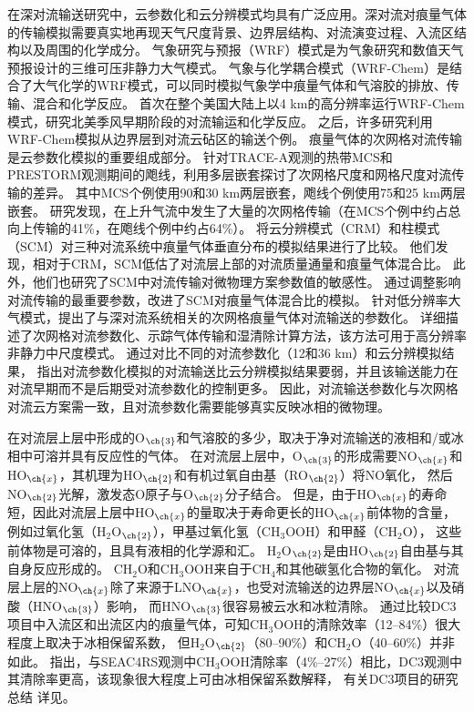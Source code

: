 在深对流输送研究中，云参数化和云分辨模式均具有广泛应用。深对流对痕量气体的传输模拟需要真实地再现天气尺度背景、边界层结构、对流演变过程、入流区结构以及周围的化学成分。 气象研究与预报（WRF）模式是为气象研究和数值天气预报设计的三维可压非静力大气模式。
气象与化学耦合模式（WRF-Chem）是结合了大气化学的WRF模式，可以同时模拟气象学中痕量气体和气溶胶的排放、传输、混合和化学反应\citep{Fast.2006,Grell.2005}。
\citet{Barth.2012}首次在整个美国大陆上以4 km的高分辨率运行WRF-Chem模式，研究北美季风早期阶段的对流输运和化学反应。
之后，许多研究利用WRF-Chem模拟从边界层到对流云砧区的输送个例\citep{Bela.2016,Li.2017b,Li.2018}。
痕量气体的次网格对流传输是云参数化模拟的重要组成部分。
\citet{Wang.1996}针对TRACE-A观测的热带MCS和PRESTORM观测期间的飑线，利用多层嵌套探讨了次网格尺度和网格尺度对流传输的差异。
其中MCS个例使用90和30 km两层嵌套，飑线个例使用75和25 km两层嵌套。
研究发现，在上升气流中发生了大量的次网格传输（在MCS个例中约占总向上传输的41\%，在飑线个例中约占64\%）。
\citet{Ott.2009}将云分辨模式（CRM）和柱模式（SCM）对三种对流系统中痕量气体垂直分布的模拟结果进行了比较。
他们发现，相对于CRM，SCM低估了对流层上部的对流质量通量和痕量气体混合比。
此外，他们也研究了SCM中对流传输对微物理方案参数值的敏感性。
通过调整影响对流传输的最重要参数，改进了SCM对痕量气体混合比的模拟。
\citet{Freitas.2000}针对低分辨率大气模式，提出了与深对流系统相关的次网格痕量气体对流输送的参数化。
\citet{Grell.2014}详细描述了次网格对流参数化、示踪气体传输和湿清除计算方法，该方法可用于高分辨率非静力中尺度模式。
\citet{Li.2018}通过对比不同的对流参数化（12和36 km）和云分辨模拟结果，
指出对流参数化模拟的对流输送比云分辨模拟结果要弱，并且该输送能力在对流早期而不是后期受对流参数化的控制更多。
因此，对流输送参数化与次网格对流云方案需一致，且对流参数化需要能够真实反映冰相的微物理。

在对流层上层中形成的O$_{\ch{3}}$和气溶胶的多少，取决于净对流输送的液相和/或冰相中可溶并具有反应性的气体。
在对流层上层中，O$_{\ch{3}}$的形成需要NO$_{\ch{x}}$和HO$_{\ch{x}}$，其机理为HO$_{\ch{2}}$和有机过氧自由基（RO$_{\ch{2}}$）将NO氧化，
然后NO$_{\ch{2}}$光解，激发态O原子与O$_{\ch{2}}$分子结合。
但是，由于HO$_{\ch{x}}$的寿命短，因此对流层上层中HO$_{\ch{x}}$的量取决于寿命更长的HO$_{\ch{x}}$前体物的含量\citep{Chatfield.1984,Prather.1997}，
例如过氧化氢（H$_2$O$_{\ch{2}}$），甲基过氧化氢（CH$_3$OOH）和甲醛（CH$_2$O），
这些前体物是可溶的，且具有液相的化学源和汇\citep{Barth.2007,Carlton.2007}。
H$_2$O$_{\ch{2}}$是由HO$_{\ch{2}}$自由基与其自身反应形成的。 CH$_2$O和CH$_3$OOH来自于CH$_4$和其他碳氢化合物的氧化。
对流层上层的NO$_{\ch{x}}$除了来源于LNO$_{\ch{x}}$，也受对流输送的边界层NO$_{\ch{x}}$以及硝酸（HNO$_{\ch{3}}$）影响\citep{Grassian.2005}，
而HNO$_{\ch{3}}$很容易被云水和冰粒清除\citep{Neu.2012}。
通过比较DC3项目中入流区和出流区内的痕量气体，可知CH$_3$OOH的清除效率（12--84\%）很大程度上取决于冰相保留系数，
但H$_2$O$_{\ch{2}}$（80--90\%）和CH$_2$O（40--60\%）并非如此\citep{Barth.2016,Bela.2016,Fried.2016}。
\citet{Cuchiara.2020}指出，与SEAC4RS观测中CH$_3$OOH清除率（4\%--27\%）相比，DC3观测中其清除率更高，该现象很大程度上可由冰相保留系数解释，
有关DC3项目的研究总结
详见\citet{Barth.2019}。

